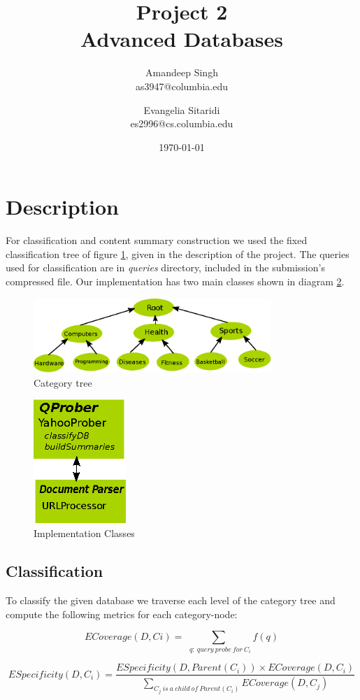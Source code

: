 \documentclass[11pt]{article}
\title{Project 2 \\ Advanced Databases \\}
\author{
Amandeep Singh\\as3947@columbia.edu
\and
Evangelia Sitaridi \\ es2996@cs.columbia.edu
}
\date{\today}
\begin{document}
\maketitle

\section{Description}
For classification and content summary construction we used the fixed classification tree of figure \ref{fig:tree}, given in the description of the project. The queries
used for classification are in \textit{queries} directory, included in the submission's compressed file. Our implementation has two main classes shown in diagram \ref{fig:classes}.

\begin{figure}[htb!]
\centering
\includegraphics[width=90mm]{cattree}
\caption{Category tree}
\label{fig:tree}
\end{figure}


\begin{figure}[htb!]
\centering
\includegraphics[width=35mm]{classes}
\caption{Implementation Classes}
\label{fig:classes}
\end{figure}

\subsection{Classification}
To classify the given database we traverse each level of the category tree and compute the following metrics for each category-node:

\[ECoverage(D,Ci)=\sum_{\ \ q: \ query \ probe \ for \ C_i}{f(q)} \]

\[ESpecificity(D, C_i ) = \frac{ESpecificity(D, Parent(C_i )) \times ECoverage(D, C_i )} {\sum_{C_j \ is \ a \ child \ of \ Parent(C_i)} {ECoverage(D,C_j)}} \]
\end{document}
